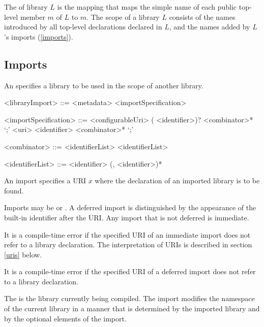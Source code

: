 \documentclass[makeidx]{article}
\begin{document}
{\LMHash{}%
The  of library $L$ is the mapping that maps the simple name of each public top-level member $m$ of $L$ to $m$.
The scope of a library $L$ consists of the names introduced by all top-level declarations declared in $L$, and the names added by $L$'s imports (\ref{imports}).


\subsection{Imports}

\LMHash{}%
An  specifies a library to be used in the scope of another library.
\begin{grammar}
<libraryImport> ::= <metadata> <importSpecification>

<importSpecification> ::= \gnewline{}
  \IMPORT{} <configurableUri> (\AS{} <identifier>)? <combinator>* `;'
  \alt \IMPORT{} <uri> \DEFERRED{} \AS{} <identifier> <combinator>* `;'

<combinator> ::= \SHOW{} <identifierList>
  \alt \HIDE{} <identifierList>

<identifierList> ::= <identifier> (, <identifier>)*
\end{grammar}

\LMHash{}%
An import specifies a URI $x$ where the declaration of an imported library is to be found.

\LMHash{}%
Imports may be
 or
.
A deferred import is distinguished by the appearance of the built-in identifier \DEFERRED{} after the URI.
Any import that is not deferred is immediate.

\LMHash{}%
It is a compile-time error if the specified URI of an immediate import does not refer to a library declaration.
The interpretation of URIs is described in section \ref{uris} below.

\LMHash{}%
It is a compile-time error if the specified URI of a deferred import does not refer to a library declaration.


\LMHash{}%
The  is the library currently being compiled.
The import modifies the namespace of the current library in a manner that is determined by the imported library and by the optional elements of the import.

}
\end{document}
